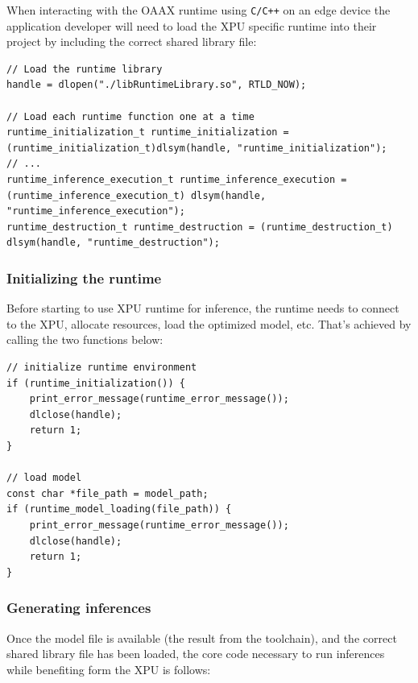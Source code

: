 \documentclass{article}
\begin{document}
When interacting with the OAAX runtime using \texttt{C/C++} on an edge device the application developer will need to load the XPU specific runtime into their project by including the correct shared library file:

\begin{lstlisting}
// Load the runtime library
handle = dlopen("./libRuntimeLibrary.so", RTLD_NOW);

// Load each runtime function one at a time
runtime_initialization_t runtime_initialization = (runtime_initialization_t)dlsym(handle, "runtime_initialization");
// ...
runtime_inference_execution_t runtime_inference_execution = (runtime_inference_execution_t) dlsym(handle, "runtime_inference_execution");
runtime_destruction_t runtime_destruction = (runtime_destruction_t) dlsym(handle, "runtime_destruction");
\end{lstlisting}

\subsubsection{Initializing the runtime}

Before starting to use XPU runtime for inference, the runtime needs to connect to the XPU, allocate resources, load the optimized model, etc.
That's achieved by calling the two functions below:

\begin{lstlisting}
// initialize runtime environment
if (runtime_initialization()) {
    print_error_message(runtime_error_message());
    dlclose(handle);
    return 1;
}

// load model
const char *file_path = model_path;
if (runtime_model_loading(file_path)) {
    print_error_message(runtime_error_message());
    dlclose(handle);
    return 1;
}
\end{lstlisting}

\subsubsection{Generating inferences}

Once the model file is available (the result from the toolchain), and the correct shared library file has been loaded, the core code necessary to run inferences while benefiting form the XPU is follows:
\end{document}
